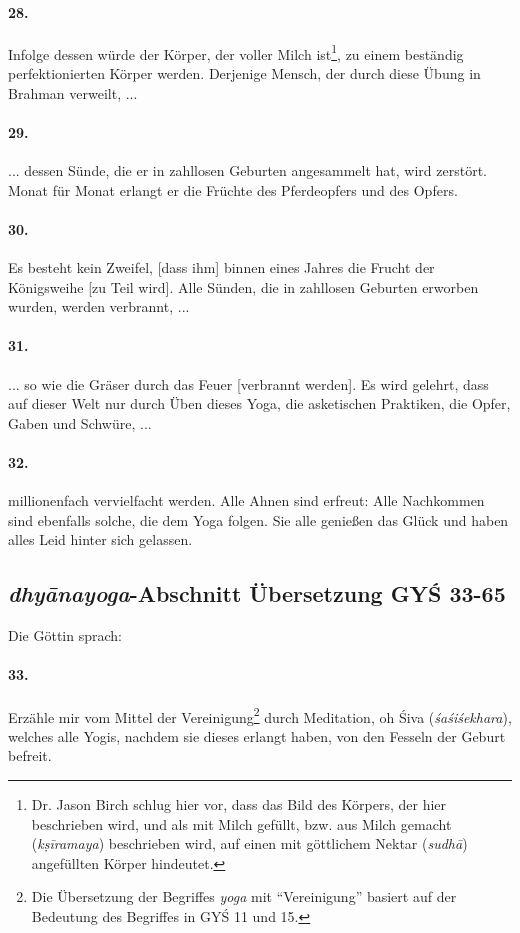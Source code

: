 \documentclass[a4paper,12pt]{article}
\begin{document}
\paragraph{28.} Infolge dessen würde der Körper, der voller Milch ist\footnote{Dr. Jason Birch schlug hier vor, dass das Bild des Körpers, der hier beschrieben wird, und als mit Milch gefüllt, bzw. aus Milch gemacht (\textit{kṣīramaya}) beschrieben wird, auf einen mit göttlichem Nektar (\textit{sudhā}) angefüllten Körper hindeutet.}, zu einem beständig perfektionierten Körper werden. Derjenige Mensch, der durch diese Übung in Brahman verweilt, ...

\paragraph{29.} ... dessen Sünde, die er in zahllosen Geburten angesammelt hat, wird zerstört. Monat für Monat erlangt er die Früchte des Pferdeopfers und des Opfers.

\paragraph{30.} Es besteht kein Zweifel, [dass ihm] binnen eines Jahres die Frucht der Königsweihe [zu Teil wird]. Alle Sünden, die in zahllosen Geburten erworben wurden, werden verbrannt, ... 

\paragraph{31.} ... so wie die Gräser durch das Feuer [verbrannt werden]. Es wird gelehrt, dass auf dieser Welt nur durch Üben dieses Yoga, die asketischen Praktiken, die Opfer, Gaben und Schwüre, ... 

\paragraph{32.} millionenfach vervielfacht werden. Alle Ahnen sind erfreut: Alle Nachkommen sind ebenfalls solche, die dem Yoga folgen. Sie alle genießen das Glück und haben alles Leid hinter sich gelassen. 

\subsection{\textit{dhyānayoga}-Abschnitt Übersetzung GYŚ 33-65}

\noindent Die Göttin sprach: 

\paragraph{33.} Erzähle mir vom Mittel der Vereinigung\footnote{Die Übersetzung der Begriffes \textit{yoga} mit ``Vereinigung'' basiert auf der Bedeutung des Begriffes in GYŚ 11 und 15.} durch Meditation, oh Śiva (\textit{śaśiśekhara}), welches alle Yogis, nachdem sie dieses erlangt haben, von den Fesseln der Geburt befreit. 
\\
\end{document}
